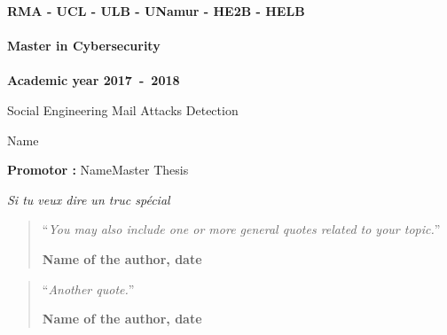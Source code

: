 \documentclass[11pt,a4paper,oneside]{book}
\begin{document}
\frontmatter
\begin{titlepage}
\begin{center}
\textbf{RMA - UCL - ULB - UNamur - HE2B - HELB}\\ \ \\
\textbf{Master in Cybersecurity}\\ \ \\
\textbf{Academic year 2017~-~2018}
\vfill{}\vfill{}

{\Huge Social Engineering Mail Attacks Detection \linebreak}

{\Huge \par}
\begin{center}{\LARGE Name}\end{center}{\Huge \par}
\vfill{}\vfill{}
\begin{flushright}{\large \textbf{Promotor :} Name}\hfill{}{\large Master Thesis}\\
{\large }\hfill{}{}\end{flushright}{\large\par}
\vfill{}\vfill{}\enlargethispage{3cm}
\end{center}
\end{titlepage}
\newpage
\thispagestyle{empty}
\null

\newenvironment{vcenterpage}
{\newpage\thispagestyle{empty}
\vspace*{\fill}}
{\vspace*{\fill}\par\pagebreak}

\begin{vcenterpage}
\begin{flushright}
    \large\em\null\vskip1in
    Si tu veux dire un truc spécial\vfill
  \end{flushright}
\end{vcenterpage}
\thispagestyle{empty}
\vspace*{5cm}

\begin{quotation}
\noindent ``\emph{You may also include one or more general quotes related to your topic.}''
\begin{flushright}\textbf{Name of the author, date}\end{flushright}
\end{quotation}

\medskip

\begin{quotation}
\noindent ``\emph{Another quote.}''
\begin{flushright}\textbf{Name of the author, date}\end{flushright}
\end{quotation}
\end{document}
